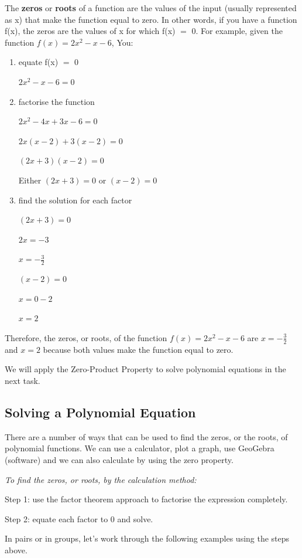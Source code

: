 The \textbf{zeros} or \textbf{roots} of a function are the values of the input (usually
represented as x) that make the function equal to zero. In other words, if you have
a function f(x), the zeros are the values of x for which f(x) $=$ 0. For example,
given the function $f(x) = 2x^2 - x - 6$, You:
\begin{enumerate}
  \item equate f(x) $=$ 0

  $2x^2 - x - 6 = 0$
  \item factorise the function

  $2x^2 - 4x + 3x - 6 = 0$

  $2x(x - 2) + 3(x - 2) = 0$

  $(2x + 3)(x - 2) = 0$

  Either $(2x + 3) = 0$ or $(x - 2) = 0$
  \item find the solution for each factor

  $(2x + 3) = 0$

  $2x = -3$

  $x = -\frac{3}{2}$

  $(x - 2) = 0$

  $x = 0 - 2$

  $x = 2$
\end{enumerate}
Therefore, the zeros, or roots, of the function $f(x) = 2x^2 - x - 6$ are
$x = -\frac{3}{2}$ and $x = 2$ because both values make the function equal to zero.

We will apply the Zero-Product Property to solve polynomial equations in the
next task.

\subsection{Solving a Polynomial Equation}

There are a number of ways that can be used to find the zeros, or the roots, of
polynomial functions. We can use a calculator, plot a graph, use GeoGebra
(software) and we can also calculate by using the zero property.

\textit{To find the zeros, or roots, by the calculation method:}

Step 1: use the factor theorem approach to factorise the expression completely.

Step 2: equate each factor to 0 and solve.

In pairs or in groups, let's work through the following examples using the steps
above.

